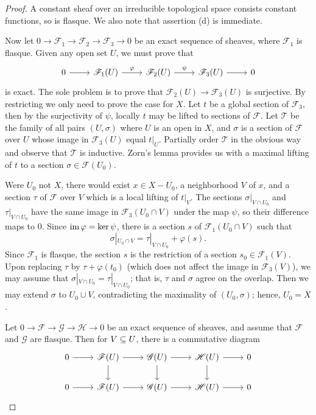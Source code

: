 \documentclass[11pt]{book}
\theoremstyle{definition}
\begin{document}
\begin{proof}
A constant sheaf over an irreducible topological space consists constant functions, so is flasque. We also note that assertion (d) is immediate.\par
Now let $0\to\mathscr{F}_1\to\mathscr{F}_2\to\mathscr{F}_3\to 0$ be an exact sequence of sheaves, where $\mathscr{F}_1$ is flasque. Given any open set $U$, we must prove that
\[\begin{tikzcd}
0\ar[r]&\mathscr{F}_1(U)\ar[r,"\varphi"]&\mathscr{F}_2(U)\ar[r,"\psi"]&\mathscr{F}_3(U)\ar[r]&0
\end{tikzcd}\]
is exact. The sole problem is to prove that $\mathscr{F}_2(U)\to\mathscr{F}_3(U)$ is surjective. By restricting we only need to prove the case for $X$. Let $t$ be a global section of $\mathscr{F}_3$, then by the surjectivity of $\psi$, locally $t$ may be lifted to sections of $\mathscr{F}$. Let $\mathcal{T}$ be the family of all pairs $(U,\sigma)$ where $U$ is an open in $X$, and $\sigma$ is a section of $\mathscr{F}$ over $U$ whose image in $\mathscr{F}_3(U)$ equal $t|_{U}$. Partially order $\mathcal{T}$ in the obvious way and observe that $\mathcal{T}$ is inductive. Zorn's lemma provides us with a maximal lifting of $t$ to a section $\sigma\in\mathscr{F}(U_0)$.\par
Were $U_0$ not $X$, there would exist $x\in X-U_0$, a neighborhood $V$ of $x$, and a section $\tau$ of $\mathscr{F}$ over $V$ which is a local lifting of $t|_V$. The sections $\sigma|_{V\cap U_0}$ and $\tau|_{V\cap U_0}$ have the same image in $\mathscr{F}_3(U_0\cap V)$ under the map $\psi$, so their difference maps to $0$. Since $\mathrm{im}\,\varphi=\mathrm{ker}\,\psi$, there is a section $s$ of $\mathscr{F}_1(U_0\cap V)$ such that
\[\sigma|_{U_0\cap V}=\tau|_{V\cap U_0}+\varphi(s).\]
Since $\mathscr{F}_1$ is flasque, the section $s$ is the restriction of a section $s_0\in\mathscr{F}_1(V)$. Upon replacing $\tau$ by $\tau+\varphi(t_0)$ (which does not affect the image in $\mathscr{F}_3(V)$), we may assume that $\sigma|_{V\cap U_0}=\tau|_{V\cap U_0}$; that is, $\tau$ and $\sigma$ agree on the overlap. Then we may extend $\sigma$ to $U_0\cup V$, contradicting the maximality of $(U_0,\sigma)$; hence, $U_0=X$.\par
Let $0\to\mathscr{F}\to\mathscr{G}\to\mathscr{H}\to 0$ be an exact sequence of sheaves, and assume that $\mathscr{F}$ and $\mathscr{G}$ are flasque. Then for $V\subseteq U$, there is a commutative diagram
\[\begin{tikzcd}
0\ar[r]&\mathscr{F}(U)\ar[r]\ar[d]&\mathscr{G}(U)\ar[r]\ar[d]&\mathscr{H}(U)\ar[r]\ar[d]&0\\
0\ar[r]&\mathscr{F}(U)\ar[r]&\mathscr{G}(U)\ar[r]&\mathscr{H}(U)\ar[r]&0
\end{tikzcd}\]
\end{proof}
\end{document}
